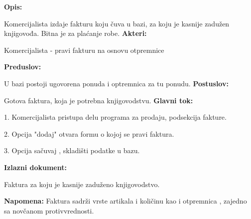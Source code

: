 \textbf{Opis:}

Komercijalista izdaje fakturu koju čuva u bazi, za koju je kasnije zadužen knjigovođa. Bitna je za plaćanje robe.
\newline
\textbf{Akteri:}

Komercijalista - pravi fakturu na osnovu otpremnice

\textbf{Preduslov:}

U bazi postoji ugovorena ponuda i optremnica za tu ponudu.
\newline
\textbf{Postuslov:}

Gotova faktura, koja je potrebna knjigovodstvu.
\newline
\textbf{Glavni tok:}

1. Komercijalista pristupa delu programa za prodaju, podsekcija fakture.

2. Opcija "dodaj" otvara formu o kojoj se pravi faktura.

3. Opcija sačuvaj , skladišti podatke u bazu.
\newline

\textbf{Izlazni dokument:}

Faktura za koju je kasnije zaduženo knjigovodstvo.

\textbf{Napomena:}
Faktura sadrži vrste artikala i količinu kao i otpremnica , zajedno sa novčanom protivvrednosti.